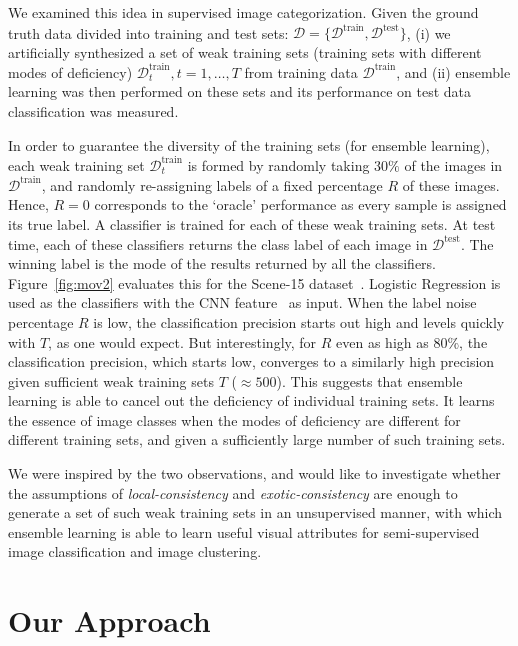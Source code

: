 \documentclass[preprint,12pt,3p]{elsarticle}
\def\dtrain{\mathcal{D}^\text{train}}
\begin{document}
We examined this idea in supervised
image categorization.  Given the ground truth data divided into training
and test sets: $\mathcal D = \{\mathcal{D}^\text{train} ,
\mathcal{D}^\text{test}\}$, (i) we artificially synthesized a set of
weak training sets (training sets with different modes of deficiency)
$\mathcal{D}^\text{train}_t, t=1,\ldots,T$ from training data
$\mathcal{D}^\text{train}$, and (ii) ensemble learning was then
performed on these sets and its performance on test data
classification was measured.

In order to guarantee the diversity of the training sets (for ensemble
learning), each weak training set $\mathcal{D}^\text{train}_t$ is
formed by randomly taking $30\%$ of the images in $\dtrain$, and
randomly re-assigning labels of a fixed percentage $R$ of these
images. Hence, $R=0$ corresponds to the `oracle' performance as
every sample is assigned its true label.  A classifier is trained for
each of these weak training sets.  At test time, each of these
classifiers returns the class label of each image in
$\mathcal{D}^\text{test}$. The winning label is the mode of the
results returned by all the classifiers.  Figure~\ref{fig:mov2}
evaluates this for the Scene-15
dataset~\citep{lazebnik:cvpr06}. Logistic Regression is used as the
classifiers with the CNN feature~\citep{deep:bmvc14} as
input.  When the label noise percentage $R$ is low, the classification
precision starts out high and levels quickly with $T$, as one would
expect. But interestingly, for $R$ even as high as $80\%$, the
classification precision, which starts low, converges to a similarly
high precision given sufficient weak training sets $T$ ($\approx
500$).  This suggests that ensemble learning is able to cancel out the
deficiency of individual training sets. It learns the essence of image
classes when the modes of deficiency are different for different
training sets, and given a sufficiently large number of such training sets.

We were inspired by the two observations, and would like to
investigate whether the assumptions of \emph{local-consis\-tency} and
\emph{exotic-consistency} are enough to generate a set of such weak
training sets in an unsupervised manner, with which ensemble learning
is able to learn useful visual attributes for semi-supervised
image classification and image clustering.



\section{Our Approach}
\label{sec:approach}
\end{document}
